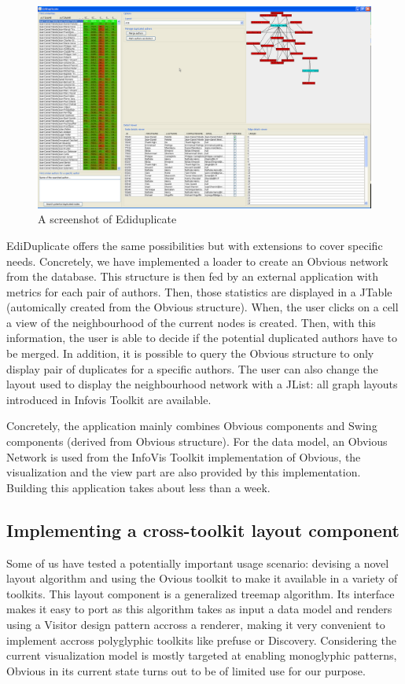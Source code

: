 \begin{figure}[!h]
\includegraphics[width=\columnwidth]{figures/ediduplicate}
\caption{A screenshot of Ediduplicate}
\label{fig:ediduplicate}
\end{figure}

EdiDuplicate offers the same possibilities but with extensions to cover specific needs. Concretely, we have implemented a loader to create an Obvious network from the  database. This structure is then fed by an external application with metrics for each pair of authors. Then, those statistics are displayed in a JTable (automically created from the Obvious structure). When, the user clicks on a cell a view of the neighbourhood of the current nodes is created. Then, with this information, the user is able to decide if the potential duplicated authors have to be merged. In addition, it is possible to query the Obvious structure to only display pair of duplicates for a specific authors. The user can also change the layout used to display the neighbourhood network with a JList: all graph layouts introduced in Infovis Toolkit are available. 

Concretely, the application mainly combines Obvious components and Swing components (derived from Obvious structure). For the data model, an Obvious Network is used from the InfoVis Toolkit implementation of Obvious, the visualization and the view part are also provided by this implementation. Building this application takes about less than a week.
\subsection{Implementing a cross-toolkit layout component}

Some of us have tested a potentially important usage scenario: devising a novel layout algorithm and using the Ovious toolkit to make it available in a variety of toolkits. This layout component is a generalized treemap algorithm.
Its interface makes it easy to port as this algorithm takes as input a data model and renders using a Visitor design pattern accross a renderer, making it very convenient to implement accross polyglyphic toolkits like prefuse or Discovery. Considering the current visualization model is mostly targeted at enabling monoglyphic patterns, Obvious in its current state turns out to be of limited use for our purpose.

